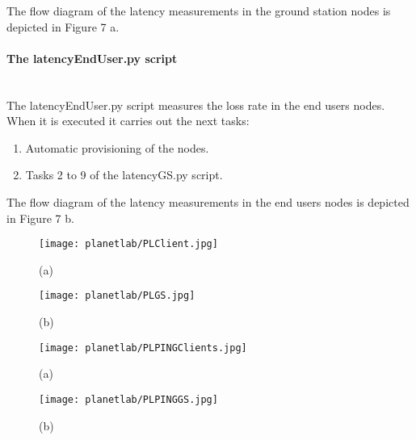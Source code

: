 The flow diagram of the latency measurements in the ground station nodes is depicted in Figure 7 a.
 
\paragraph{The latencyEndUser.py script}~\\

The latencyEndUser.py  script measures the loss rate in the end users
nodes. When it is executed it carries out the next tasks:
\begin{enumerate}
\item Automatic provisioning of the nodes.
\item Tasks 2 to 9 of the latencyGS.py script.
\end{enumerate}

The flow diagram of the latency measurements in the end users nodes is depicted
in Figure 7 b.

\begin{multicols}{2}
\begin{figure}[!h]
\begin{center}
\texttt{[image: planetlab/PLClient.jpg]}
\caption{(a)}
\label{fig:ple-workflow-bandwidth}
\end{center}
\end{figure}
\columnbreak
\begin{figure}[!h]
\begin{center}
\texttt{[image: planetlab/PLGS.jpg]}
\caption{(b)}
\label{fig:ple-workflow-loss-rate}
\end{center}
\end{figure}
\end{multicols}

\begin{multicols}{2}
\begin{figure}[!h]
\begin{center}
\texttt{[image: planetlab/PLPINGClients.jpg]}
\caption{(a)}
\label{fig:ple-workflow-latency-user}
\end{center}
\end{figure}
\columnbreak
\begin{figure}[!h]
\begin{center}
\texttt{[image: planetlab/PLPINGGS.jpg]}
\caption{(b)}
\label{fig:ple-workflow-latency-gs}
\end{center}
\end{figure}
\end{multicols}


